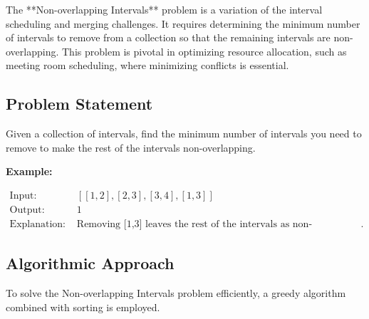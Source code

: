 
\label{problem:NonOverlappingIntervals}

The **Non-overlapping Intervals** problem is a variation of the interval scheduling and merging challenges. It requires determining the minimum number of intervals to remove from a collection so that the remaining intervals are non-overlapping. This problem is pivotal in optimizing resource allocation, such as meeting room scheduling, where minimizing conflicts is essential.

\subsection*{Problem Statement}
Given a collection of intervals, find the minimum number of intervals you need to remove to make the rest of the intervals non-overlapping.

\textbf{Example:}

\[
\begin{aligned}
\text{Input: } & [[1,2],[2,3],[3,4],[1,3]] \\
\text{Output: } & 1 \\
\text{Explanation: } & \text{Removing [1,3] leaves the rest of the intervals as non-overlapping}.
\end{aligned}
\]

\subsection*{Algorithmic Approach}
To solve the Non-overlapping Intervals problem efficiently, a greedy algorithm combined with sorting is employed.

